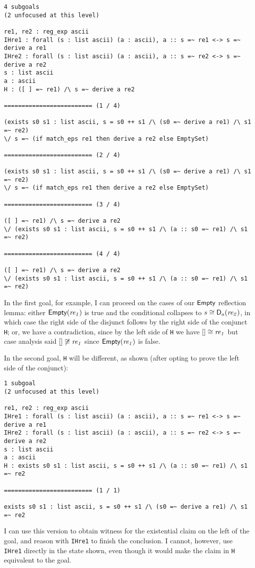 \begin{verbatim}
4 subgoals
(2 unfocused at this level)

re1, re2 : reg_exp ascii
IHre1 : forall (s : list ascii) (a : ascii), a :: s =~ re1 <-> s =~ derive a re1
IHre2 : forall (s : list ascii) (a : ascii), a :: s =~ re2 <-> s =~ derive a re2
s : list ascii
a : ascii
H : ([ ] =~ re1) /\ s =~ derive a re2

========================= (1 / 4)

(exists s0 s1 : list ascii, s = s0 ++ s1 /\ (s0 =~ derive a re1) /\ s1 =~ re2)
\/ s =~ (if match_eps re1 then derive a re2 else EmptySet)

========================= (2 / 4)

(exists s0 s1 : list ascii, s = s0 ++ s1 /\ (s0 =~ derive a re1) /\ s1 =~ re2)
\/ s =~ (if match_eps re1 then derive a re2 else EmptySet)

========================= (3 / 4)

([ ] =~ re1) /\ s =~ derive a re2
\/ (exists s0 s1 : list ascii, s = s0 ++ s1 /\ (a :: s0 =~ re1) /\ s1 =~ re2)

========================= (4 / 4)

([ ] =~ re1) /\ s =~ derive a re2
\/ (exists s0 s1 : list ascii, s = s0 ++ s1 /\ (a :: s0 =~ re1) /\ s1 =~ re2)
\end{verbatim}

In the first goal, for example, I can proceed on the cases of our
\(\mathsf{Empty}\) reflection lemma: either \(\mathsf{Empty}(\mathit{re_1})\) is true
and the conditional collapses to \(s \mathrel{\cong} \mathsf{D}_a(\mathit{re_2})\), in which
case the right side of the disjunct follows by the right side of the conjunct
\texttt{H}; or, we have a contradiction, since by the left side of \texttt{H} we have \([]
\mathrel{\cong} \mathit{re_1}\) but case analysis said \([] \not\mathrel{\cong} \mathit{re_1}\)
since \(\mathsf{Empty}(\mathit{re_1})\) is false.

In the second goal, \texttt{H} will be different, as shown (after opting to
prove the left side of the conjunct):
\begin{verbatim}
1 subgoal
(2 unfocused at this level)

re1, re2 : reg_exp ascii
IHre1 : forall (s : list ascii) (a : ascii), a :: s =~ re1 <-> s =~ derive a re1
IHre2 : forall (s : list ascii) (a : ascii), a :: s =~ re2 <-> s =~ derive a re2
s : list ascii
a : ascii
H : exists s0 s1 : list ascii, s = s0 ++ s1 /\ (a :: s0 =~ re1) /\ s1 =~ re2

========================= (1 / 1)

exists s0 s1 : list ascii, s = s0 ++ s1 /\ (s0 =~ derive a re1) /\ s1 =~ re2
\end{verbatim}
I can use this version to obtain witness for the existential claim on the left
of the goal, and reason with \texttt{IHre1} to finish the conclusion. I cannot,
however, use \texttt{IHre1} directly in the state shown, even though it would
make the claim in \texttt{H} equivalent to the goal.

